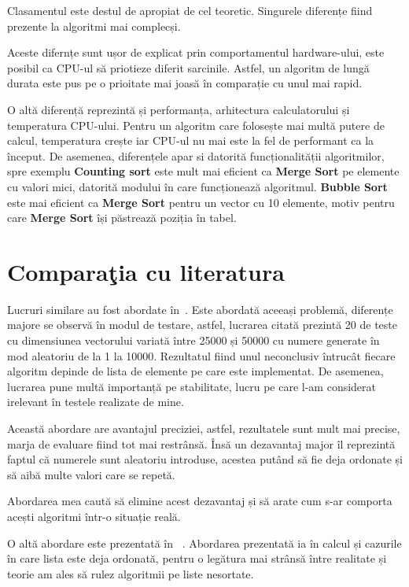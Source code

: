 \documentclass[12pt]{article}
\begin{document}
Clasamentul este destul de apropiat de cel teoretic.
Singurele diferențe fiind prezente la algoritmi mai complecși.

Aceste difernțe sunt ușor de explicat prin comportamentul hardware-ului, este posibil ca CPU-ul să priotieze diferit sarcinile. Astfel, un algoritm de lungă durata este pus pe o prioitate mai joasă în comparație cu unul mai rapid. 

\pagebreak


O altă diferență reprezintă și performanța, arhitectura calculatorului și temperatura CPU-ului. Pentru un algoritm care folosește mai multă putere de calcul, temperatura crește iar CPU-ul nu mai este la fel de performant ca la început.
De asemenea, diferențele apar si datorită funcționalității algoritmilor, spre exemplu \textbf{Counting sort} este mult mai eficient ca \textbf{Merge Sort} pe elemente cu valori mici, datorită modului în care funcționează algoritmul. \textbf{Bubble Sort} este  mai eficient ca \textbf{Merge Sort} 
pentru un vector cu 10 elemente, motiv pentru care \textbf{Merge Sort} își păstrează poziția în tabel.

\section{Comparaţia cu literatura}
\label{sec:comp}
Lucruri similare au fost abordate în~\cite{LAMFO2019}.
Este abordată aceeași problemă, diferențe majore se observă în modul de testare, astfel, lucrarea citată prezintă 20 de teste cu dimensiunea vectorului variată între 25000 și 50000 cu numere generate în mod aleatoriu de la 1 la 10000. Rezultatul fiind unul neconclusiv întrucât fiecare algoritm depinde de lista de elemente pe care este implementat. De asemenea, lucrarea pune multă importanță pe stabilitate, lucru pe care l-am considerat irelevant în testele realizate de mine.


\pagebreak
Această abordare are avantajul preciziei, astfel, rezultatele sunt mult mai precise, marja de evaluare fiind tot mai restrânsă. 
Însă un dezavantaj major îl reprezintă faptul că numerele sunt aleatoriu introduse, acestea putând să fie deja ordonate și să aibă multe valori care se repetă.

Abordarea mea caută să elimine acest dezavantaj și să arate cum s-ar comporta acești algoritmi într-o situație reală.

O altă abordare este prezentată în ~\cite{COMP2015}. Abordarea prezentată ia în calcul și cazurile în care lista este deja ordonată, pentru o legătura mai strânsă între realitate și teorie am ales să rulez algoritmii pe liste nesortate.
\end{document}
